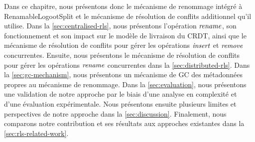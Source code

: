 Dans ce chapitre, nous présentons donc le mécanisme de renommage intégré à RenamableLogootSplit et le mécanisme de résolution de conflits additionnel qu'il utilise.
Dans la \autoref{sec:centralised-rls}, nous présentons l'opération $\mathit{rename}$, \ie son fonctionnement et son impact sur le modèle de livraison du \ac{CRDT}, ainsi que le mécanisme de résolution de conflits pour gérer les opérations $\mathit{insert}$ et $\mathit{remove}$ concurrentes.
Ensuite, nous présentons le mécanisme de résolution de conflits pour gérer les opérations $\mathit{rename}$ concurrentes dans la \autoref{sec:distributed-rls}.
Dans la \autoref{sec:gc-mechanism}, nous présentons un mécanisme de \acf{GC} des métadonnées propres au mécanisme de renommage.
Dans la \autoref{sec:evaluation}, nous présentons une validation de notre approche par le biais d'une analyse en complexité et d'une évaluation expérimentale.
Nous présentons ensuite plusieurs limites et perspectives de notre approche dans la \autoref{sec:discussion}.
Finalement, nous comparons notre contribution et ses résultats aux approches existantes dans la \autoref{sec:rls-related-work}.
